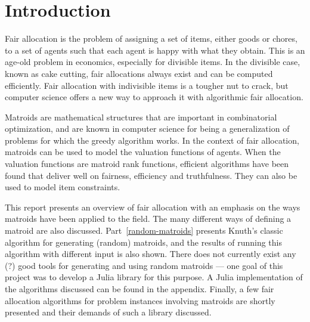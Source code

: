 \chapter{Introduction}

Fair allocation is the problem of assigning a set of items, either goods or chores, to a set of agents such that each agent is happy with what they obtain. This is an age-old problem in economics, especially for divisible items. In the divisible case, known as cake cutting, fair allocations always exist and can be computed efficiently. Fair allocation with indivisible items is a tougher nut to crack, but computer science offers a new way to approach it with algorithmic fair allocation.

Matroids are mathematical structures that are important in combinatorial optimization, and are known in computer science for being a generalization of problems for which the greedy algorithm works. In the context of fair allocation, matroids can be used to model the valuation functions of agents. When the valuation functions are matroid rank functions, efficient algorithms have been found that deliver well on fairness, efficiency and truthfulness. They can also be used to model item constraints.

This report presents an overview of fair allocation with an emphasis on the ways matroids have been applied to the field. The many different ways of defining a matroid are also discussed. Part~\ref{random-matroids} presents Knuth's classic algorithm for generating (random) matroids, and the results of running this algorithm with different input is also shown. There does not currently exist any (?) good tools for generating and using random matroids --- one goal of this project was to develop a Julia library for this purpose. A Julia implementation of the algorithms discussed can be found in the appendix. Finally, a few fair allocation algorithms for problem instances involving matroids are shortly presented and their demands of such a library discussed.